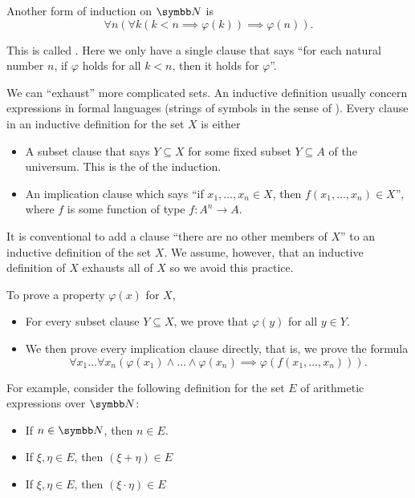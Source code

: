 \begin{remark}
  Another form of induction on \( \BN \) is
  \begin{equation*}
    \forall n (\forall k (k < n \implies \varphi(k)) \implies \varphi(n)).
  \end{equation*}

  This is called . Here we only have a single clause that says \enquote{for each natural number \( n \), if \( \varphi \) holds for all \( k < n \), then it holds for \( \varphi \)}.

  We can \enquote{exhaust} more complicated sets. An inductive definition usually concern expressions in formal languages (strings of symbols in the sense of ). Every clause in an inductive definition for the set \( X \) is either
  \begin{itemize}
    \item A subset clause that says \( Y \subseteq X \) for some fixed subset \( Y \subseteq A \) of the universum. This is the  of the induction.
    \item An implication clause which says \enquote{if \( x_1, \ldots, x_n \in X \), then \( f(x_1, \ldots, x_n) \in X \)}, where \( f \) is some function of type \( f: A^n \to A \).
  \end{itemize}

  It is conventional to add a clause \enquote{there are no other members of \( X \)} to an inductive definition of the set \( X \). We assume, however, that an inductive definition of \( X \) exhausts all of \( X \) so we avoid this practice.

  To prove a property \( \varphi(x) \) for \( X \),
  \begin{itemize}
    \item For every subset clause \( Y \subseteq X \), we prove that \( \varphi(y) \) for all \( y \in Y \).
    \item We then prove every implication clause directly, that is, we prove the formula
    \begin{equation*}
      \forall x_1 \ldots \forall x_n (\varphi(x_1) \land \ldots \land \varphi(x_n) \implies \varphi(f(x_1, \ldots, x_n))).
    \end{equation*}
  \end{itemize}

  For example, consider the following definition for the set \( E \) of arithmetic expressions over \( \BN \):
  \begin{itemize}
    \item If \( n \in \BN \), then \( n \in E \).
    \item If \( \xi, \eta \in E \), then \( (\xi + \eta) \in E \)
    \item If \( \xi, \eta \in E \), then \( (\xi \cdot \eta) \in E \)
  \end{itemize}


\end{remark}
